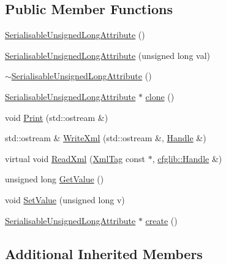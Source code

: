 \subsection*{Public Member Functions}
\begin{DoxyCompactItemize}
\item 
\hyperlink{classcfglib_1_1SerialisableUnsignedLongAttribute_aff224e279f182410e70cc2f73dc38f26}{Serialisable\+Unsigned\+Long\+Attribute} ()
\item 
\hyperlink{classcfglib_1_1SerialisableUnsignedLongAttribute_ac6880388351a7c03d870af88e4f06091}{Serialisable\+Unsigned\+Long\+Attribute} (unsigned long val)
\item 
\hyperlink{classcfglib_1_1SerialisableUnsignedLongAttribute_a7b2c594072846372117bd1f3add92a55}{$\sim$\+Serialisable\+Unsigned\+Long\+Attribute} ()
\item 
\hyperlink{classcfglib_1_1SerialisableUnsignedLongAttribute}{Serialisable\+Unsigned\+Long\+Attribute} $\ast$ \hyperlink{classcfglib_1_1SerialisableUnsignedLongAttribute_a5ddcd35aa3f13ae354bf6dd65839baba}{clone} ()
\item 
void \hyperlink{classcfglib_1_1SerialisableUnsignedLongAttribute_a4d53682ce58f689045c6f55a04e1c6cd}{Print} (std\+::ostream \&)
\item 
std\+::ostream \& \hyperlink{classcfglib_1_1SerialisableUnsignedLongAttribute_ad0ffd60cbd393da8b75508c14ab43ce2}{Write\+Xml} (std\+::ostream \&, \hyperlink{classcfglib_1_1Handle}{Handle} \&)
\item 
virtual void \hyperlink{classcfglib_1_1SerialisableUnsignedLongAttribute_acbd51f33a309bb606b7182ab0d49463b}{Read\+Xml} (\hyperlink{classXmlTag}{Xml\+Tag} const $\ast$, \hyperlink{classcfglib_1_1Handle}{cfglib\+::\+Handle} \&)
\item 
unsigned long \hyperlink{classcfglib_1_1SerialisableUnsignedLongAttribute_a185de3958143579ecdef682cafda4ae8}{Get\+Value} ()
\item 
void \hyperlink{classcfglib_1_1SerialisableUnsignedLongAttribute_a9d6e44a34c15ede16bfb85bd3b817990}{Set\+Value} (unsigned long v)
\item 
\hyperlink{classcfglib_1_1SerialisableUnsignedLongAttribute}{Serialisable\+Unsigned\+Long\+Attribute} $\ast$ \hyperlink{classcfglib_1_1SerialisableUnsignedLongAttribute_a394a14fb12e3e0e11f37bf8e625f4901}{create} ()
\end{DoxyCompactItemize}
\subsection*{Additional Inherited Members}


